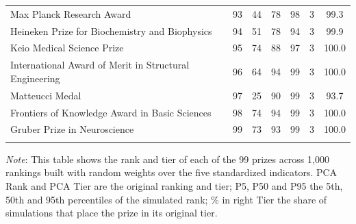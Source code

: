 \begin{longtable}{>{\raggedright\arraybackslash}p{6.6cm}cccccc}
Max Planck Research Award & 93 & 44 & 78 & 98 & 3 & 99.3 \\ 
Heineken Prize for Biochemistry and Biophysics & 94 & 51 & 78 & 94 & 3 & 99.9 \\ 
Keio Medical Science Prize & 95 & 74 & 88 & 97 & 3 & 100.0 \\ 
International Award of Merit in Structural Engineering & 96 & 64 & 94 & 99 & 3 & 100.0 \\ 
Matteucci Medal & 97 & 25 & 90 & 99 & 3 & 93.7 \\ 
Frontiers of Knowledge Award in Basic Sciences & 98 & 74 & 94 & 99 & 3 & 100.0 \\ 
Gruber Prize in Neuroscience & 99 & 73 & 93 & 99 & 3 & 100.0 \\ 
\hline \\[-1.8ex] 
\end{longtable}\endgroup 

\noindent \footnotesize \textit{Note}: This table shows the rank and tier of each of the 99 prizes across 1,000 rankings built with random weights over the five standardized indicators. PCA Rank and PCA Tier are the original ranking and tier; P5, P50 and P95 the 5th, 50th and 95th percentiles of the simulated rank; \% in right Tier the share of simulations that place the prize in its original tier.
